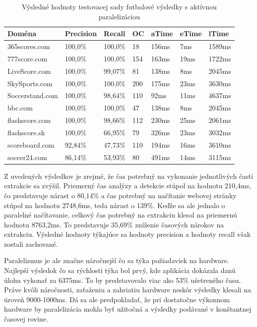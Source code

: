 \begin{table}[hbt]
\caption{Výsledné hodnoty testovacej sady futbalové výsledky s aktívnou paralelizáciou}
\centering
\begin{tabular}{|l|l|l|l|l|l|l|}
\hline
\textbf{Doména}          & \textbf{Precision} & \textbf{Recall}  & \textbf{OC}  & \textbf{aTime} & \textbf{eTime} & \textbf{lTime}  \\ \hline
365scores.com   & 100,0\%   & 100,0\% & 18  & 156ms & 7ms   & 1589ms  \\ \hline
777score.com    & 100,0\%   & 100,0\% & 154 & 163ms  & 19ms  & 1722ms \\ \hline
LiveScore.com   & 100,0\%   & 99,07\% & 81  & 138ms  & 8ms   & 2045ms  \\ \hline
SkySports.com   & 100,0\%   & 100,0\% & 200 & 175ms & 23ms  & 3630ms  \\ \hline
Soccerstand.com & 100,0\%   & 98,64\% & 110 & 92ms  & 11ms  & 4637ms \\ \hline
bbc.com         & 100,0\%   & 100,0\% & 47  &  138ms  & 8ms  & 2045ms \\ \hline
flashscore.com  & 100,0\%   & 98,66\% & 112 & 230ms  & 25ms   & 2061ms \\ \hline
flashscore.sk   & 100,0\%   & 66,95\% & 79  & 326ms & 23ms   & 3032ms \\ \hline
scoreboard.com  & 92,84\%   & 47,73\% & 110 & 194ms & 16ms  & 3610ms \\ \hline
soccer24.com    & 86,14\%   & 53,93\% & 80  & 491ms & 14ms  & 3115ms \\ \hline
\end{tabular}
\end{table}

Z uvedených výsledkov je zrejmé, že čas potrebný na vykonanie jednotlivých častí extrakcie sa zvýšil. Priemerný čas analýzy a detekcie stúpol na hodnotu 210,4ms, čo predstavuje nárast o 80,14\% a čas potrebný na načítanie webovej stránky stúpol na hodnotu 2748,6ms, teda nárast o 139\%. Keďže sa ale jednalo o paralelné načítavanie, celkový čas potrebný na extrakciu klesol na priemernú hodnotu 8763,2ms. To predstavuje 35,69\% zníženie časových nárokov na extrakciu. Výsledné hodnoty týkajúce sa hodnoty precision a hodnoty recall však zostali zachované.

Paralelizmus je ale značne náročnejší čo sa týka požiadaviek na hardware. Najlepší výsledok čo sa rýchlosti týka bol prvý, kde aplikácia dokázala danú úlohu vykonať za 6375ms. To by predstavovalo viac ako 53\% ušetreného času. Práve kvôli náročnosti, zaťaženiu a zahriatiu hardware neskôr výsledky klesali na úroveň 9000-1000ms. Dá sa ale predpokladať, že pri dostatočne výkonnom hardware by paralelizácia mohla byť užitočná a výsledky podávané v konštantnej časovej rovine.

